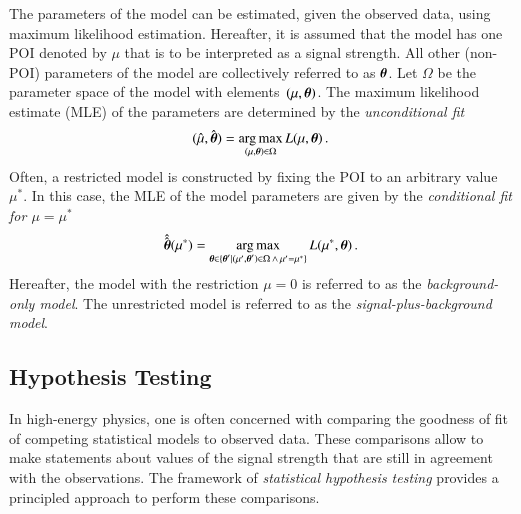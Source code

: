The parameters of the model can be estimated, given the observed data, using
maximum likelihood estimation. Hereafter, it is assumed that the model has one
POI denoted by $\mu$ that is to be interpreted as a signal strength. All other
(non-POI) parameters of the model are collectively referred to as
$\myvec{\theta}$. Let $\Omega$ be the parameter space of the model with
elements~$(\mu, \myvec{\theta})$. The maximum likelihood estimate (MLE) of the
parameters are determined by the \emph{unconditional fit}
\begin{align}
  (\muhat, \hat{\myvec{\theta}}) = \argmax_{(\mu, \myvec{\theta}) \in \Omega} L(\mu, \myvec{\theta}) \,\text{.}
  \label{eq:unconditional_fit}
\end{align}
Often, a restricted model is constructed by fixing the POI to an arbitrary value
$\mu^*$. In this case, the MLE of the model parameters are given by the
\emph{conditional fit for $\mu = \mu^*$}
\begin{align}
  \hat{\hat{\myvec{\theta}}}(\mu^*) = \argmax_{\myvec{\theta} \in \{ \myvec{\theta}^\prime \mid (\mu^\prime, \myvec{\theta}^\prime) \in \Omega \,\land\, \mu^\prime = \mu^* \} } L(\mu^*, \myvec{\theta}) \,\text{.}
  \label{eq:conditional_fit}
\end{align}
Hereafter, the model with the restriction $\mu = 0$ is referred to as the
\emph{background-only model}. The unrestricted model is referred to as the
\emph{signal-plus-background model}.



\subsection{Hypothesis Testing}

In high-energy physics, one is often concerned with comparing the goodness of
fit of competing statistical models to observed data. These comparisons allow to
make statements about values of the signal strength that are still in agreement
with the observations. The framework of \emph{statistical hypothesis testing}
provides a principled approach to perform these comparisons.

